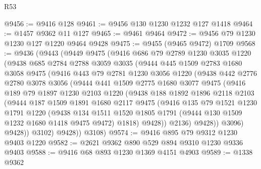 \begin{lexlean}{R53}
\begin{coremodule}
@9456 := @9416 @128
@9461 := @9456 @130 @1230 @1232 @127 @1418
@9464 := @1457 @9362 @11 @127
@9465 := @9461 @9464
@9472 := @9456 @79 @1230 @1230 @127 @1220 @9464 @9428
@9475 := @9455 (@9465 @9472) @1709
@9568 := @9436
    (@9443
      (@9449
        @9475
        (@9416
          @686
          @79
          @2789
          @1230
          @3035
          @1220
          (@9438
            @685
            @2784
            @2788
            @3059
            @3035
            (@9444
              @445
              @1509
              @2783
              @1680
              @3058
              @9475
              (@9416
                @443
                @79
                @2781
                @1230
                @3056
                @1220
                (@9438
                  @442
                  @2776
                  @2780
                  @3078
                  @3056
                  (@9444
                    @441
                    @1509
                    @2775
                    @1680
                    @3077
                    @9475
                    (@9416
                      @189
                      @79
                      @1897
                      @1230
                      @2103
                      @1220
                      (@9438
                        @188
                        @1892
                        @1896
                        @2118
                        @2103
                        (@9444
                          @187
                          @1509
                          @1891
                          @1680
                          @2117
                          @9475
                          (@9416
                            @135
                            @79
                            @1521
                            @1230
                            @1791
                            @1220
                            (@9438
                              @134
                              @1511
                              @1520
                              @1805
                              @1791
                              (@9444 @130 @1509 @1232 @1680 @1418 @9475 @9472)
                              @1818)
                            @9428))
                        @2136)
                      @9428))
                  @3096)
                @9428))
            @3102)
          @9428))
      @3108)
@9574 := @9416 @895 @79 @9312 @1230 @9403 @1220
@9582 := @2621 @9362 @890 @529 @894 @9310 @1230 @9336 @9403
@9588 := @9416 @68 @893 @1230 @1369 @4151 @4903
@9589 := @1338 @9362

\end{coremodule}
\end{lexlean}

